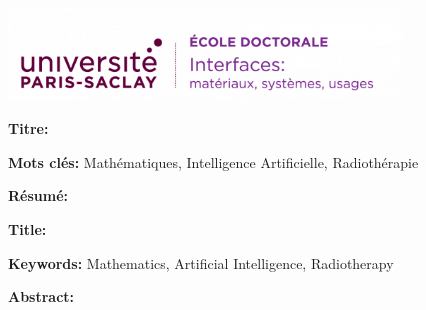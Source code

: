 \thispagestyle{empty}

\noindent 
\includegraphics[height=2.45cm]{preamble/ed-interfaces.png}
\vspace{1cm}

\small

\begin{mdframed}[linecolor=Prune,linewidth=1]
	
	\textbf{Titre:} 
	
	\vspace{1mm} \noindent
	\textbf{Mots clés:} Mathématiques, Intelligence Artificielle, Radiothérapie
	
	\begin{multicols}{2}
		\noindent \textbf{Résumé:}
		\lipsum[1-2]
		
	\end{multicols}
	
\end{mdframed}

\vspace{8mm}

\begin{mdframed}[linecolor=Prune,linewidth=1]
	
	\textbf{Title:} 
	
	\vspace{1mm} \noindent
	\textbf{Keywords:} Mathematics, Artificial Intelligence, Radiotherapy
	
	\begin{multicols}{2}
		\noindent \textbf{Abstract:} 
		\lipsum[1-2]
		
	\end{multicols}
\end{mdframed}



